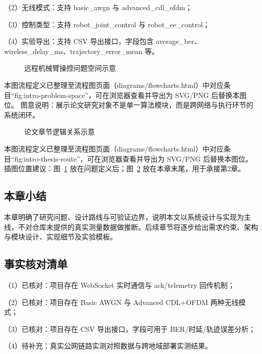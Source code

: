 （2）无线模式：支持 basic\_awgn 与 advanced\_cdl\_ofdm；

（3）控制类型：支持 robot\_joint\_control 与 robot\_ee\_control；

（4）实验导出：支持 CSV 导出接口，字段包含 average\_ber、wireless\_delay\_ms、trajectory\_error\_mean 等。

\begin{figure}[htbp]
\centering
{}
\caption{远程机械臂操控问题空间示意}
\label{fig:intro-problem-space}
\end{figure}

\noindent 本图流程定义已整理至流程图页面（diagrams/flowcharts.html）中对应条目“fig:intro-problem-space”，可在浏览器查看并导出为 SVG/PNG 后替换本图位。
\noindent 图意说明：展示论文研究对象不是单一算法模块，而是跨网络与执行环节的系统闭环。

\begin{figure}[htbp]
\centering
{}
\caption{论文章节逻辑关系示意}
\label{fig:intro-thesis-route}
\end{figure}

\noindent 本图流程定义已整理至流程图页面（diagrams/flowcharts.html）中对应条目“fig:intro-thesis-route”，可在浏览器查看并导出为 SVG/PNG 后替换本图位。
\noindent 插图位置建议：图~\ref{fig:intro-problem-space} 放在问题定义后；图~\ref{fig:intro-thesis-route} 放在本章末尾，用于承接第2章。

\subsection{本章小结}
本章明确了研究问题、设计路线与可验证边界，说明本文以系统设计与实现为主线，不对仓库未提供的真实测量数据做推断。后续章节将逐步给出需求约束、架构与模块设计、实现细节及实验模板。

\subsection{事实核对清单}
（1）已核对：项目存在 WebSocket 实时通信与 ack/telemetry 回传机制；

（2）已核对：项目存在 Basic AWGN 与 Advanced CDL+OFDM 两种无线模式；

（3）已核对：项目存在 CSV 导出接口，字段可用于 BER/时延/轨迹误差分析；

（4）待补充：真实公网链路实测对照数据与跨地域部署实测结果。
